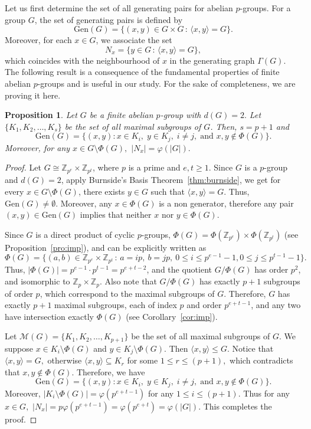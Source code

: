 \documentclass[11pt]{article}
\newtheorem{pro}[theorem]{Proposition}
\begin{document}
Let us first determine the set of all generating pairs for abelian $p$-groups.
For a group $G$, the set of generating pairs is defined by
\[
  \mathrm{Gen}(G) = \{(x,y)\in G\times G \,:\, \langle x,y\rangle = G\}.
\]
Moreover, for each $x\in G$, we associate the set
\[
  N_x = \{y\in G \,:\,  \langle x,y\rangle = G\},
\]
which coincides with the neighbourhood of $x$ in the generating graph $\Gamma(G)$.  The following result is a consequence of the fundamental properties of finite abelian $p$-groups and is useful in our study. For the sake of completeness, we are proving it here.
\begin{pro}\label{pro:pgen}
    Let \( G \) be a finite abelian \( p \)-group with $d(G)=2.$ Let \( \{K_1, K_2, \dots, K_s\} \) be the set of all maximal subgroups of \( G \). Then, $s=p+1$ and  $$
        \mathrm{Gen}(G)=\{(x,y): x\in K_i,\; y\in K_j,\; i\neq j,\; \text{and } x,y\notin \Phi(G)\}.
        $$ Moreover, for any $x\in G\setminus \Phi(G),$  $|N_x|=\varphi(|G|).$
\end{pro}
\begin{proof}
    Let $G \cong \mathbb{Z}_{p^e} \times \mathbb{Z}_{p^t}$, where $p$ is a prime and $e, t\geq 1$. Since $G$ is a $p$-group and $d(G)=2$, apply Burnside’s Basis Theorem~\ref{thm:burnside}, we get for every $x \in G \setminus \Phi(G)$, there exists $y \in G$ such that $\langle x, y \rangle = G$. Thus, $\mathrm{Gen}(G)\neq \emptyset.$ Moreover, any $x\in \Phi(G)$ is a non generator, therefore any pair $(x,y)\in \mathrm{Gen}(G)$ implies that neither $x$ nor $y\in \Phi(G).$ 
    
    Since $G$ is a direct product of cyclic $p$-groups, $\Phi(G) = \Phi(\mathbb{Z}_{p^e}) \times \Phi(\mathbb{Z}_{p^t})$ (see Proposition~\ref{pro:imp}), and can be explicitly written as
    \begin{equation}
    \Phi(G) = \{(a, b) \in \mathbb{Z}_{p^e} \times \mathbb{Z}_{p^t} \,:\,  a = ip,\ b = jp,\ 0\leq i\leq p^{e-1}-1, 0\leq j\leq p^{t-1}-1 \}.
    \end{equation}
    Thus, $|\Phi(G)| = p^{e-1} \cdot p^{t-1} = p^{e + t - 2}$, and the quotient $G / \Phi(G)$ has order $p^2$, and isomorphic to $\mathbb{Z}_p \times \mathbb{Z}_p$. Also note that $G/\Phi(G)$ has exactly $p + 1$ subgroups of order $p$, which correspond to the maximal subgroups of $G$. Therefore, $G$ has exactly $p + 1$ maximal subgroups, each of index $p$ and order $p^{e + t - 1}$, and any two have intersection exactly $\Phi(G)$ (see Corollary~\ref{cor:imp}). 
    
 
    Let $\mathcal {M}(G)=\{K_1,K_2,\dots,K_{p+1}\}$ be the set of all maximal subgroups of $G.$ We suppose $x\in K_i\setminus \Phi(G)$ and $y\in K_j\setminus \Phi(G).$ Then $\langle x,y\rangle\leq G.$ Notice that $\langle x,y\rangle= G,$ otherwise  $\langle x,y\rangle \subseteq K_r$ for some $1\leq r\leq (p+1),$ which contradicts that $x,y\notin \Phi(G).$ Therefore, we have
    $$
    \mathrm{Gen}(G)=\{(x,y): x\in K_i,\; y\in K_j,\; i\neq j,\; \text{and } x,y\notin \Phi(G)\}.
    $$ Moreover, $|K_i \setminus \Phi(G)|=\varphi(p^{e + t - 1})$ for any $1\leq i\leq (p+1).$ Thus for any $x\in G,$
    $
    |N_x|=p \varphi(p^{e + t - 1}) = \varphi(p^{e + t})=\varphi(|G|).
    $
    This completes the proof.
\end{proof}
\end{document}

